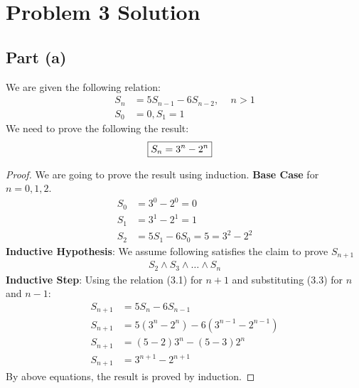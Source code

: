 \documentclass{article}
\begin{document}
\section{Problem 3 Solution}{
  \subsection{Part (a)}{
    We are given the following relation:
    \begin{align}
      S_n&=5S_{n-1}-6S_{n-2},\, \quad n>1 \\ \label{eq:1}
      S_0&=0,S_1=1 
    \end{align}
    We need to prove the following the result:
    \begin{align}
      \Aboxed{S_n=3^n-2^n} \label{eq:3}
    \end{align}
    \begin{proof}
      We are going to prove the result using induction. \newline
      \textbf{Base Case} for $n=0,1,2$.
      \begin{align*}
        S_0&=3^0-2^0=0 \\
        S_1&=3^1-2^1=1 \\
        S_2&=5S_1-6S_0=5=3^2-2^2
      \end{align*}
      \textbf{Inductive Hypothesis}: We assume following satisfies the claim to prove $S_{n+1}$
      \begin{align*}
        S_2 \land S_3 \land \dots \land S_n
      \end{align*}
      \textbf{Inductive Step}: Using the relation (3.1) for $n+1$ and substituting (3.3) for $n$ and $n-1$:
      \begin{align*}
        S_{n+1}&=5S_n-6S_{n-1} \\
        S_{n+1}&=5(3^n-2^n)-6(3^{n-1}-2^{n-1}) \\
        S_{n+1}&=(5-2)3^n-(5-3)2^n \\
        S_{n+1}&=3^{n+1}-2^{n+1}
      \end{align*}
      By above equations, the result is proved by induction. \newline
    \end{proof}
  }
}
\end{document}
